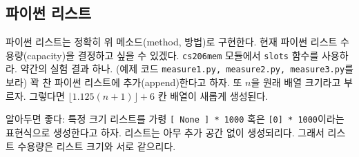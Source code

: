 \documentclass[a4paper]{oblivoir}
\begin{document}
\subsection*{파이썬 리스트}

파이썬 리스트는 정확히 위 메소드(method, 방법)로 구현한다. 현재 파이썬 리스트 수용량(capacity)을 결정하고 싶을 수 있겠다. \texttt{cs206mem} 모듈에서 \texttt{slots} 함수를 사용하라. 약간의 실험 결과 하나. (예제 코드 \texttt{measure1.py, measure2.py, measure3.py}를 보라) 꽉 찬 파이썬 리스트에 추가(append)한다고 하자. 또 $n$을 원래 배열 크기라고 부르자. 그렇다면  $\lfloor1.125(n+1)\rfloor+6$ 칸 배열이 새롭게 생성된다. 

알아두면 좋다: 특정 크기 리스트를 가령 \texttt{[ None ] * 1000} 혹은 \texttt{[0] * 1000}이라는 표현식으로 생성한다고 하자. 리스트는 아무 추가 공간 없이 생성되리다. 그래서 리스트 수용량은 리스트 크기와 서로 같으리다. 
\end{document}
